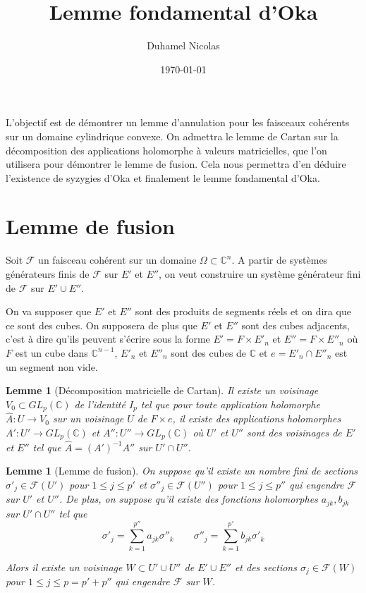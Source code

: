 \documentclass{article}
\newtheorem{lemme}[theoreme]{Lemme}
\theoremstyle{definition}
\theoremstyle{remarque}
\begin{document}
\title{Lemme fondamental d'Oka}
\date \today
\author{Duhamel Nicolas}
\maketitle

L'objectif est de démontrer un lemme d'annulation pour les faisceaux cohérents sur un domaine cylindrique convexe. On admettra le lemme de Cartan sur la décomposition des applications holomorphe à valeurs matricielles, que l'on utilisera pour démontrer le lemme de fusion. Cela nous permettra d'en déduire l'existence de syzygies d'Oka et finalement le lemme fondamental d'Oka.

\section{Lemme de fusion}
Soit $\mathcal{F}$ un faisceau cohérent sur un domaine $\Omega \subset \mathbb{C}^n$. A partir de systèmes générateurs finis de $\mathcal{F}$ sur $E'$ et $E''$, on veut construire un système générateur fini de $\mathcal{F}$ sur $E' \cup E''$.

On va supposer que $E'$ et $E''$ sont des produits de segments réels et on dira que ce sont des cubes. On supposera de plus que $E'$ et $E''$ sont des cubes adjacents, c'est à dire qu'ils peuvent s'écrire sous la forme $E'=F \times E'_n$ et $E''=F \times E''_n$ où $F$ est un cube dans $\mathbb{C}^{n-1}$, $E'_n$ et $E''_n$ sont des cubes de $\mathbb{C}$ et $e=E'_n \cap E''_n$ est un segment non vide.

\begin{lemme}[Décomposition matricielle de Cartan]
Il existe un voisinage $V_0 \subset GL_p(\mathbb{C})$ de l'identité $I_p$ tel que pour toute application holomorphe $\hat{A} : U \to V_0$ sur un voisinage $U$ de $F \times e$, il existe des applications holomorphes $A' : U' \to GL_p(\mathbb{C})$ et $A'' : U'' \to GL_p(\mathbb{C})$ où $U'$ et $U''$ sont des voisinages de $E'$ et $E''$ tel que $\hat{A} = (A')^{-1}A''$ sur $U' \cap U''$.
\end{lemme}

\begin{lemme}[Lemme de fusion]
On suppose qu'il existe un nombre fini de sections $\sigma'_j \in \mathcal{F}(U')$ pour $1\leq j \leq p'$ et $\sigma''_j \in \mathcal{F}(U'')$ pour $1\leq j \leq p''$ qui engendre $\mathcal{F}$ sur $U'$ et $U''$. De plus, on suppose qu'il existe des fonctions holomorphes $a_{jk}, b_{jk}$ sur $U' \cap U''$ tel que
\begin{equation*}
\sigma'_j = \sum_{k=1}^{p''} a_{jk}\sigma''_k \qquad
\sigma''_j = \sum_{k=1}^{p'} b_{jk}\sigma'_k
\end{equation*}

Alors il existe un voisinage $W \subset U' \cup U''$ de $E' \cup E''$ et des sections $\sigma_j \in \mathcal{F}(W)$ pour $1\leq j \leq p=p'+p''$ qui engendre $\mathcal{F}$ sur $W$.
\end{lemme}
\end{document}
